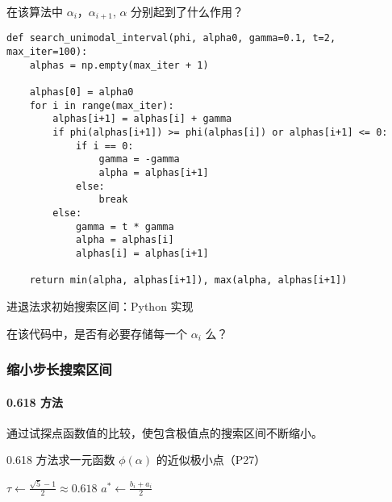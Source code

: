 \documentclass[cn]{elegantpaper}
\begin{document}
\begin{remark}
    在该算法中 $\alpha_{i}$，$\alpha_{i+1}$, $\alpha$ 分别起到了什么作用？
\end{remark}

\begin{listing}[H]
    \begin{verbatim}
def search_unimodal_interval(phi, alpha0, gamma=0.1, t=2, max_iter=100):
    alphas = np.empty(max_iter + 1)

    alphas[0] = alpha0
    for i in range(max_iter):
        alphas[i+1] = alphas[i] + gamma
        if phi(alphas[i+1]) >= phi(alphas[i]) or alphas[i+1] <= 0:
            if i == 0:
                gamma = -gamma
                alpha = alphas[i+1]
            else:
                break
        else:
            gamma = t * gamma
            alpha = alphas[i]
            alphas[i] = alphas[i+1]

    return min(alpha, alphas[i+1]), max(alpha, alphas[i+1])
    \end{verbatim}
    \caption{进退法求初始搜索区间：Python 实现}
\end{listing}

\begin{remark}
    在该代码中，是否有必要存储每一个 $\alpha_{i}$ 么？
\end{remark}

\subsubsection{缩小步长搜索区间}

\paragraph{0.618 方法}

通过试探点函数值的比较，使包含极值点的搜索区间不断缩小。

\begin{algorithm}[H]
    \caption{0.618 方法求一元函数 $\phi\left(\alpha\right)$ 的近似极小点（P27）}
    $\tau\leftarrow \frac{\sqrt{5}-1}{2}\approx 0.618$\;
    $a^{*}\leftarrow\frac{b_{i}+a_{i}}{2}$\;
\end{algorithm}
\end{document}
